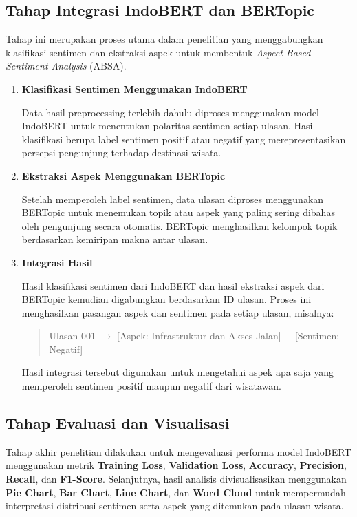 \subsection{Tahap Integrasi IndoBERT dan BERTopic}

Tahap ini merupakan proses utama dalam penelitian yang menggabungkan klasifikasi sentimen dan ekstraksi aspek untuk membentuk \textit{Aspect-Based Sentiment Analysis} (ABSA).

\begin{enumerate}
    \item \textbf{Klasifikasi Sentimen Menggunakan IndoBERT}

    Data hasil preprocessing terlebih dahulu diproses menggunakan model IndoBERT untuk menentukan polaritas sentimen setiap ulasan. Hasil klasifikasi berupa label sentimen positif atau negatif yang merepresentasikan persepsi pengunjung terhadap destinasi wisata.

    \item \textbf{Ekstraksi Aspek Menggunakan BERTopic}

    Setelah memperoleh label sentimen, data ulasan diproses menggunakan BERTopic untuk menemukan topik atau aspek yang paling sering dibahas oleh pengunjung secara otomatis. BERTopic menghasilkan kelompok topik berdasarkan kemiripan makna antar ulasan.

    \item \textbf{Integrasi Hasil}

    Hasil klasifikasi sentimen dari IndoBERT dan hasil ekstraksi aspek dari BERTopic kemudian digabungkan berdasarkan ID ulasan. Proses ini menghasilkan pasangan aspek dan sentimen pada setiap ulasan, misalnya:

    \begin{quote}
    Ulasan 001 $\rightarrow$ [Aspek: Infrastruktur dan Akses Jalan] + [Sentimen: Negatif]
    \end{quote}

    Hasil integrasi tersebut digunakan untuk mengetahui aspek apa saja yang memperoleh sentimen positif maupun negatif dari wisatawan.
\end{enumerate}

\subsection{Tahap Evaluasi dan Visualisasi}

Tahap akhir penelitian dilakukan untuk mengevaluasi performa model IndoBERT menggunakan metrik \textbf{Training Loss}, \textbf{Validation Loss}, \textbf{Accuracy}, \textbf{Precision}, \textbf{Recall}, dan \textbf{F1-Score}. Selanjutnya, hasil analisis divisualisasikan menggunakan \textbf{Pie Chart}, \textbf{Bar Chart}, \textbf{Line Chart}, dan \textbf{Word Cloud} untuk mempermudah interpretasi distribusi sentimen serta aspek yang ditemukan pada ulasan wisata.